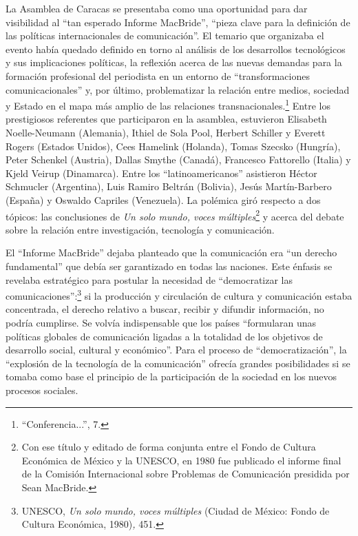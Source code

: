 \documentclass{tufte-handout}
\begin{document}
La Asamblea de Caracas se presentaba como una oportunidad para dar
visibilidad al ``tan esperado Informe MacBride'', ``pieza clave para la
definición de las políticas internacionales de comunicación''. El
temario que organizaba el evento había quedado definido en torno al
análisis de los desarrollos tecnológicos y sus implicaciones políticas,
la reflexión acerca de las nuevas demandas para la formación profesional
del periodista en un entorno de ``transformaciones comunicacionales'' y,
por último, problematizar la relación entre medios, sociedad y Estado en
el mapa más amplio de las relaciones transnacionales.\footnote{``Conferencia...'',
  7.} Entre los prestigiosos referentes que participaron en la asamblea,
estuvieron Elisabeth Noelle-Neumann (Alemania), Ithiel de Sola Pool,
Herbert Schiller y Everett Rogers (Estados Unidos), Cees Hamelink
(Holanda), Tomas Szecsko (Hungría), Peter Schenkel (Austria), Dallas
Smythe (Canadá), Francesco Fattorello (Italia) y Kjeld Veirup
(Dinamarca). Entre los ``latinoamericanos'' asistieron Héctor Schmucler
(Argentina), Luis Ramiro Beltrán (Bolivia), Jesús Martín-Barbero
(España) y Oswaldo Capriles (Venezuela). La polémica giró respecto a dos
tópicos: las conclusiones de \emph{Un solo mundo, voces
múltiples}\footnote{Con ese título y editado de forma conjunta entre el
  Fondo de Cultura Económica de México y la UNESCO, en 1980 fue
  publicado el informe final de la Comisión Internacional sobre
  Problemas de Comunicación presidida por Sean MacBride.} y acerca del
debate sobre la relación entre investigación, tecnología y comunicación.

El ``Informe MacBride'' dejaba planteado que la comunicación era ``un
derecho fundamental'' que debía ser garantizado en todas las naciones.
Este énfasis se revelaba estratégico para postular la necesidad de
``democratizar las comunicaciones'':\footnote{UNESCO, \emph{Un solo
  mundo, voces múltiples} (Ciudad de México: Fondo de Cultura Económica,
  1980)\emph{,} 451.} si la producción y circulación de cultura y
comunicación estaba concentrada, el derecho relativo a buscar, recibir y
difundir información, no podría cumplirse. Se volvía indispensable que
los países ``formularan unas políticas globales de comunicación ligadas
a la totalidad de los objetivos de desarrollo social, cultural y
económico''. Para el proceso de ``democratización'', la ``explosión de
la tecnología de la comunicación'' ofrecía grandes posibilidades si se
tomaba como base el principio de la participación de la sociedad en los
nuevos procesos sociales.
\end{document}
